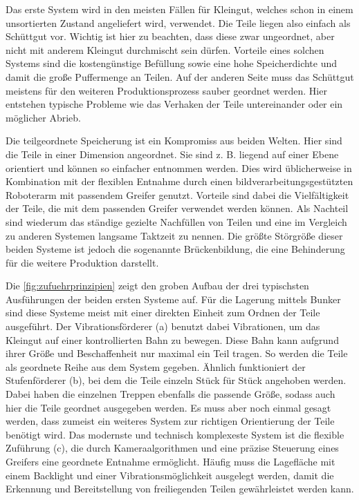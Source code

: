 Das erste System wird in den meisten Fällen für Kleingut, welches schon in einem unsortierten Zustand
angeliefert wird, verwendet. Die Teile liegen also einfach als Schüttgut vor. Wichtig ist hier zu beachten,
dass diese zwar ungeordnet, aber nicht mit anderem Kleingut durchmischt sein dürfen. Vorteile eines
solchen Systems sind die kostengünstige Befüllung sowie eine hohe Speicherdichte und damit die große Puffermenge
an Teilen. Auf der anderen Seite muss das Schüttgut meistens für den weiteren Produktionsprozess sauber
geordnet werden. Hier entstehen typische Probleme wie das Verhaken der Teile untereinander oder ein möglicher
Abrieb.

Die teilgeordnete Speicherung ist ein Kompromiss aus beiden Welten. Hier sind die Teile in einer Dimension
angeordnet. Sie sind z. B. liegend auf einer Ebene orientiert und können so einfacher entnommen werden.
Dies wird üblicherweise in Kombination mit der flexiblen Entnahme durch einen bildverarbeitungsgestützten Roboterarm
mit passendem Greifer genutzt. Vorteile sind dabei die Vielfältigkeit der Teile, die mit dem passenden Greifer verwendet
werden können. Als Nachteil sind wiederum das ständige gezielte Nachfüllen von Teilen und eine im Vergleich zu
anderen Systemen langsame Taktzeit zu nennen. Die größte Störgröße dieser beiden Systeme ist jedoch die sogenannte Brückenbildung,
die eine Behinderung für die weitere Produktion darstellt.

Die \cref{fig:zufuehrprinzipien} zeigt den groben Aufbau der
drei typischsten Ausführungen der beiden ersten Systeme auf. Für die Lagerung mittels Bunker sind diese Systeme meist
mit einer direkten Einheit zum Ordnen der Teile ausgeführt. Der Vibrationsförderer (a) benutzt dabei Vibrationen,
um das Kleingut auf einer kontrollierten Bahn zu bewegen. Diese Bahn kann aufgrund ihrer Größe und Beschaffenheit nur maximal ein Teil tragen.
So werden die Teile als geordnete Reihe aus dem System gegeben. Ähnlich funktioniert der Stufenförderer (b), bei dem
die Teile einzeln Stück für Stück angehoben werden. Dabei haben die einzelnen Treppen ebenfalls die passende Größe,
sodass auch hier die Teile geordnet ausgegeben werden. Es muss aber noch einmal gesagt werden, dass zumeist ein weiteres System
zur richtigen Orientierung der Teile benötigt wird. Das modernste und technisch komplexeste System ist die
flexible Zuführung (c), die durch Kameraalgorithmen und eine präzise Steuerung eines Greifers eine geordnete Entnahme ermöglicht.
Häufig muss die Lagefläche mit einem Backlight und einer Vibrationsmöglichkeit ausgelegt
werden, damit die Erkennung und Bereitstellung von freiliegenden Teilen gewährleistet werden kann.

